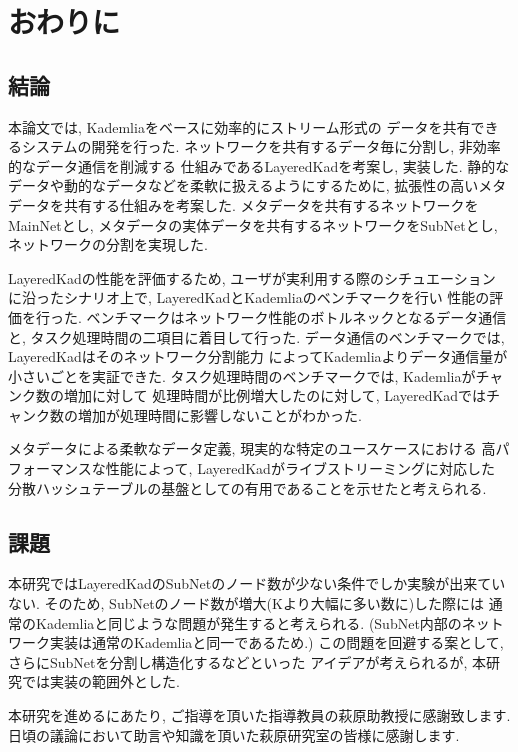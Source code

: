 \documentclass[sotsuron]{jcsie}
\begin{document}

\chapter{おわりに}
\section{結論}
本論文では, Kademliaをベースに効率的にストリーム形式の
データを共有できるシステムの開発を行った.
ネットワークを共有するデータ毎に分割し, 非効率的なデータ通信を削減する
仕組みであるLayeredKadを考案し, 実装した.
静的なデータや動的なデータなどを柔軟に扱えるようにするために, 
拡張性の高いメタデータを共有する仕組みを考案した.
メタデータを共有するネットワークをMainNetとし, 
メタデータの実体データを共有するネットワークをSubNetとし, 
ネットワークの分割を実現した.

LayeredKadの性能を評価するため, ユーザが実利用する際のシチュエーション
に沿ったシナリオ上で, LayeredKadとKademliaのベンチマークを行い
性能の評価を行った.
ベンチマークはネットワーク性能のボトルネックとなるデータ通信と, 
タスク処理時間の二項目に着目して行った.
データ通信のベンチマークでは, LayeredKadはそのネットワーク分割能力
によってKademliaよりデータ通信量が小さいごとを実証できた.
タスク処理時間のベンチマークでは, Kademliaがチャンク数の増加に対して
処理時間が比例増大したのに対して, 
LayeredKadではチャンク数の増加が処理時間に影響しないことがわかった.

メタデータによる柔軟なデータ定義, 現実的な特定のユースケースにおける
高パフォーマンスな性能によって, LayeredKadがライブストリーミングに対応した
分散ハッシュテーブルの基盤としての有用であることを示せたと考えられる.

\section{課題}
本研究ではLayeredKadのSubNetのノード数が少ない条件でしか実験が出来ていない.
そのため, SubNetのノード数が増大(Kより大幅に多い数に)した際には
通常のKademliaと同じような問題が発生すると考えられる.
(SubNet内部のネットワーク実装は通常のKademliaと同一であるため.)
この問題を回避する案として, さらにSubNetを分割し構造化するなどといった
アイデアが考えられるが, 本研究では実装の範囲外とした.

\begin{acknowledgment}
	本研究を進めるにあたり, ご指導を頂いた指導教員の萩原助教授に感謝致します.
	日頃の議論において助言や知識を頂いた萩原研究室の皆様に感謝します.
\end{acknowledgment}



\end{document}

